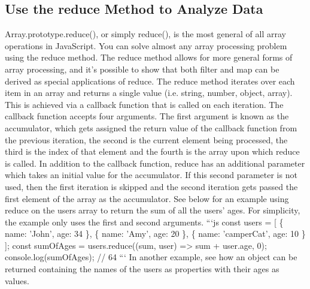 \documentclass{article}%
\begin{document}
\subsection{Use the reduce Method to Analyze Data}%
\label{subsec:UsethereduceMethodtoAnalyzeData}%
Array.prototype.reduce(), or simply reduce(), is the most general of all array operations in JavaScript. You can solve almost any array processing problem using the reduce method.\newline%
The reduce method allows for more general forms of array processing, and it's possible to show that both filter and map can be derived as special applications of reduce.\newline%
The reduce method iterates over each item in an array and returns a single value (i.e. string, number, object, array).  This is achieved via a callback function that is called on each iteration.\newline%
The callback function accepts four arguments. The first argument is known as the accumulator, which gets assigned the return value of the callback function from the previous iteration, the second is the current element being processed, the third is the index of that element and the fourth is the array upon which reduce is called.\newline%
In addition to the callback function, reduce has an additional parameter which takes an initial value for the accumulator.  If this second parameter is not used, then the first iteration is skipped and the second iteration gets passed the first element of the array as the accumulator.\newline%
See below for an example using reduce on the users array to return the sum of all the users' ages. For simplicity, the example only uses the first and second arguments.\newline%
```js\newline%
const users = {[}\newline%
  \{ name: 'John', age: 34 \},\newline%
  \{ name: 'Amy', age: 20 \},\newline%
  \{ name: 'camperCat', age: 10 \}\newline%
{]};\newline%
const sumOfAges = users.reduce((sum, user) => sum + user.age, 0);\newline%
console.log(sumOfAges); // 64\newline%
```\newline%
In another example, see how an object can be returned containing the names of the users as properties with their ages as values.\newline%
\end{document}
